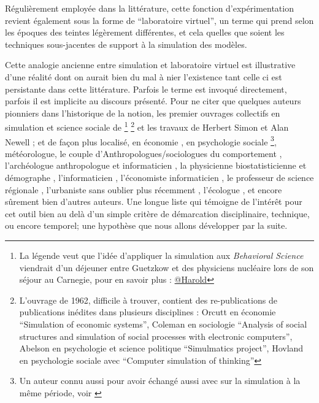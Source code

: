 Régulièrement employée dans la littérature, cette fonction d’expérimentation revient également sous la forme de \enquote{laboratoire virtuel}, un terme qui prend selon les époques des teintes légèrement différentes, et cela quelles que soient les techniques sous-jacentes de support à la simulation des modèles.

Cette analogie ancienne entre simulation et laboratoire virtuel est illustrative d'une réalité dont on aurait bien du mal à nier l'existence tant celle ci est persistante dans cette littérature. Parfois le terme est invoqué directement, parfois il est implicite au discours présenté. Pour ne citer que quelques auteurs pionniers dans l'historique de la notion, les premier ouvrages collectifs en simulation et science sociale de \textcite{Borko1962, Guetzkow1962, Guetzkow1972} \footnote{La légende veut que l'idée d'appliquer la simulation aux \textit{Behavioral Science} viendrait d'un déjeuner entre Guetzkow et des physiciens nucléaire lors de son séjour au Carnegie, pour en savoir plus : \href{http://www.hawaii.edu/intlrel/pols635f/Guetzkow/hg.html}{@Harold} } \footnote{L'ouvrage de 1962, difficile à trouver, contient des re-publications de publications inédites dans plusieurs disciplines : Orcutt en économie \foreignquote{english}{Simulation of economic systems}, Coleman en sociologie \foreignquote{english}{Analysis of social structures and simulation of social processes with electronic computers}, Abelson en psychologie et science politique \foreignquote{english}{Simulmatics project},  Hovland en psychologie sociale avec \foreignquote{english}{Computer simulation of thinking} } et les travaux de Herbert Simon et Alan Newell \autocite{Newell1961}; et de façon plus localisé, en économie \textcite[915]{Shubik1960b}, en psychologie sociale \textcite{Abelson1968} \footnote{Un auteur connu aussi pour avoir échangé aussi avec \textcite{Boudon1967} sur la simulation à la même période, voir  \textcite{Padioleau1969}}, \textcite{Fleisher1965} météorologue, le couple d'Anthropologues/sociologues du comportement \textcite{Gullahorn1965}, l'archéologue anthropologue et informaticien \textcite{Doran1970}, la physicienne biostatisticienne et démographe \textcite{Sheps1971}, l'informaticien \textcite[3-4]{Forrester1971}, l'économiste informaticien \textcite{Naylor1966}, le professeur de science régionale \textcite[271]{Harris1966}, l'urbaniste \textcite[295]{Batty1976} sans oublier plus récemment \textcite{Epstein1996}, l'écologue \textcite{Grimm2006}, et encore sûrement bien d'autres auteurs. Une longue liste qui témoigne de l'intérêt pour cet outil bien au delà d'un simple critère de démarcation disciplinaire, technique, ou encore temporel; une hypothèse que nous allons développer par la suite.

